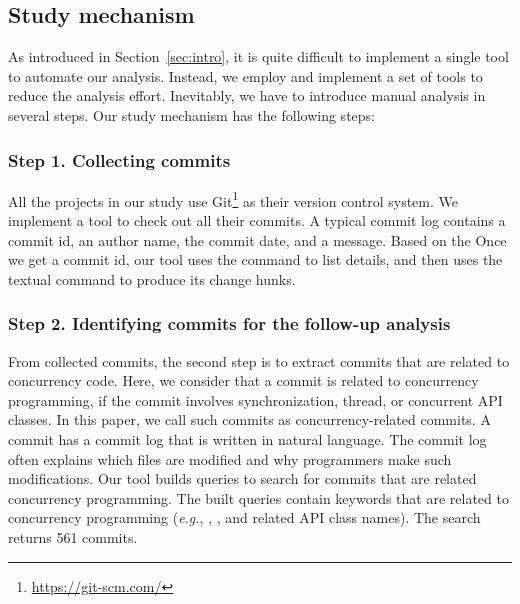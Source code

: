 \subsection{Study mechanism}
\label{sec:method:tool}
As introduced in Section~\ref{sec:intro}, it is quite difficult to implement a single tool to automate our analysis. Instead, we employ and implement a set of tools to reduce the analysis effort. Inevitably, we have to introduce manual analysis in several steps. Our study mechanism has the following steps:

\subsubsection{Step 1. Collecting commits} All the projects in our study use Git\footnote{\url{https://git-scm.com/}} as their version control system. We implement a tool to check out all their commits. A typical commit log contains a commit id, an author name, the commit date, and a message. Based on the Once we get a commit id, our tool uses the  command to list details, and then uses the textual  command to produce its change hunks.

\subsubsection{Step 2. Identifying commits for the follow-up analysis} From collected commits, the second step is to extract commits that are related to concurrency code. Here, we consider that a commit is related to concurrency programming, if the commit involves synchronization, thread, or concurrent API classes. In this paper, we call such commits as concurrency-related commits. A commit has a commit log that is written in natural language. The commit log often explains which files are modified and why programmers make such modifications. Our tool builds queries to search for commits that are related concurrency programming. The built queries contain keywords that are related to concurrency programming (\emph{e.g.}, , , and related API class names). The search returns 561 commits.

